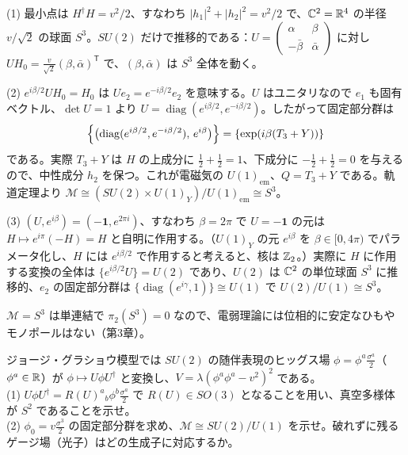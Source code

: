 \begin{solution}
(1) 最小点は $H^\dagger H=v^2/2$、すなわち $\lvert h_1\rvert^2+\lvert h_2\rvert^2=v^2/2$ で、$\mathbb{C}^2=\mathbb{R}^4$ の半径 $v/\sqrt2$ の球面 $S^3$。$SU(2)$ だけで推移的である：$U=\begin{pmatrix}\alpha&\beta\\-\bar\beta&\bar\alpha\end{pmatrix}$ に対し $UH_0=\tfrac{v}{\sqrt2}(\beta,\bar\alpha)^{\mathsf T}$ で、$(\beta,\bar\alpha)$ は $S^3$ 全体を動く。

(2) $e^{i\beta/2}UH_0=H_0$ は $U e_2=e^{-i\beta/2}e_2$ を意味する。$U$ はユニタリなので $e_1$ も固有ベクトル、$\det U=1$ より $U=\operatorname{diag}(e^{i\beta/2},e^{-i\beta/2})$。したがって固定部分群は
\[
\Bigl\{\bigl(\operatorname{diag}(e^{i\beta/2},e^{-i\beta/2}),\,e^{i\beta}\bigr)\Bigr\}=\{\exp(i\beta(T_3+Y))\}
\]
である。実際 $T_3+Y$ は $H$ の上成分に $\tfrac12+\tfrac12=1$、下成分に $-\tfrac12+\tfrac12=0$ を与えるので、中性成分 $h_2$ を保つ。これが電磁気の $U(1)_{\mathrm{em}}$、$Q=T_3+Y$ である。軌道定理より $\mathcal M\cong(SU(2)\times U(1)_Y)/U(1)_{\mathrm{em}}\cong S^3$。

(3) $(U,e^{i\beta})=(-\mathbf 1,e^{2\pi i})$、すなわち $\beta=2\pi$ で $U=-\mathbf 1$ の元は $H\mapsto e^{i\pi}(-H)=H$ と自明に作用する。（$U(1)_Y$ の元 $e^{i\beta}$ を $\beta\in[0,4\pi)$ でパラメータ化し、$H$ には $e^{i\beta/2}$ で作用すると考えると、核は $\mathbb{Z}_2$。）実際に $H$ に作用する変換の全体は $\{e^{i\beta/2}U\}=U(2)$ であり、$U(2)$ は $\mathbb{C}^2$ の単位球面 $S^3$ に推移的、$e_2$ の固定部分群は $\{\operatorname{diag}(e^{i\gamma},1)\}\cong U(1)$ で $U(2)/U(1)\cong S^3$。

$\mathcal M=S^3$ は単連結で $\pi_2(S^3)=0$ なので、電弱理論には位相的に安定なひもやモノポールはない（第3章）。
\end{solution}

\begin{problem}[難易度 B]\label{ch01-prob-adj}
ジョージ・グラショウ模型では $SU(2)$ の随伴表現のヒッグス場 $\phi=\phi^a\tfrac{\sigma^a}{2}$（$\phi^a\in\mathbb{R}$）が $\phi\mapsto U\phi U^\dagger$ と変換し、$V=\lambda(\phi^a\phi^a-v^2)^2$ である。\\
(1) $U\phi U^\dagger=R(U)^a{}_b\phi^b\tfrac{\sigma^a}{2}$ で $R(U)\in SO(3)$ となることを用い、真空多様体が $S^2$ であることを示せ。\\
(2) $\phi_0=v\tfrac{\sigma^3}{2}$ の固定部分群を求め、$\mathcal M\cong SU(2)/U(1)$ を示せ。破れずに残るゲージ場（光子）はどの生成子に対応するか。
\end{problem}

